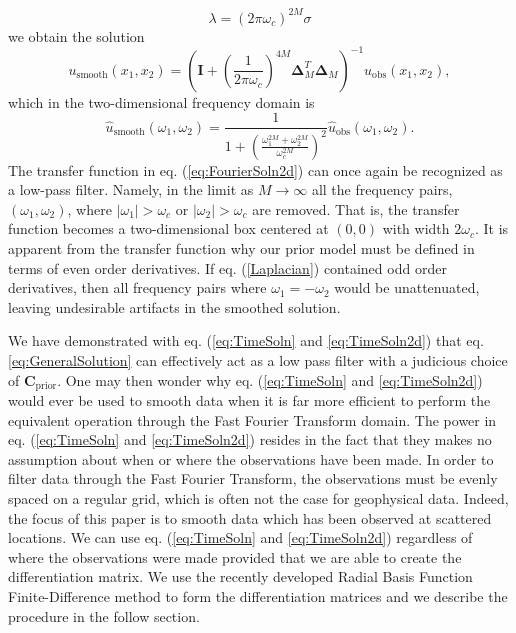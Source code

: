 \documentclass[10pt,a4paper]{article}
\begin{document}
\begin{equation}
\lambda = (2\pi\omega_c)^{2M}\sigma
\end{equation}
we obtain the solution
\begin{equation}\label{eq:TimeSoln2d}
u_\mathrm{smooth}(x_1,x_2) = \left(\mathbf{I} + 
                          \left(\frac{1}{2\pi\omega_c}\right)^{4M}
                          \mathbf{\Delta}_M^T\mathbf{\Delta}_M\right)^{-1}
                          u_\mathrm{obs}(x_1,x_2),
\end{equation}
which in the two-dimensional frequency domain is
\begin{equation}\label{eq:FourierSoln2d}
\hat{u}_\mathrm{smooth}(\omega_1,\omega_2) = \frac{1}{1 + \left(\frac{\omega_1^{2M} + \omega_2^{2M}}
                                                  {\omega_c^{2M}}\right)^2}
                                             \hat{u}_\mathrm{obs}(\omega_1,\omega_2).
\end{equation}
The transfer function in eq. (\ref{eq:FourierSoln2d}) can once again be recognized as a low-pass filter.  Namely, in the limit as $M \to \infty$ all the frequency pairs, $(\omega_1,\omega_2)$, where $|\omega_1| > \omega_c$ or $|\omega_2| > \omega_c$ are removed.  That is, the transfer function becomes a two-dimensional box centered at $(0,0)$ with width $2\omega_c$.  It is apparent from the transfer function why our prior model must be defined in terms of even order derivatives.  If eq. (\ref{Laplacian}) contained odd order derivatives, then all frequency pairs where $\omega_1=-\omega_2$ would be unattenuated, leaving undesirable artifacts in the smoothed solution.

We have demonstrated with eq. (\ref{eq:TimeSoln} and \ref{eq:TimeSoln2d}) that eq. \ref{eq:GeneralSolution} can effectively act as a low pass filter with a judicious choice of $\mathbf{C}_\mathrm{prior}$.  One may then wonder why eq. (\ref{eq:TimeSoln} and \ref{eq:TimeSoln2d}) would ever be used to smooth data when it is far more efficient to perform the equivalent operation through the Fast Fourier Transform domain.  The power in eq. (\ref{eq:TimeSoln} and \ref{eq:TimeSoln2d}) resides in the fact that they makes no assumption about when or where the observations have been made.  In order to filter data through the Fast Fourier Transform, the observations must be evenly spaced on a regular grid, which is often not the case for geophysical data.  Indeed,  the focus of this paper is to smooth data which has been observed at scattered locations.  We can use eq. (\ref{eq:TimeSoln} and \ref{eq:TimeSoln2d}) regardless of where the observations were made provided that we are able to create the differentiation matrix.  We use the recently developed Radial Basis Function Finite-Difference method to form the differentiation matrices and we describe the procedure in the follow section.  

 
\end{document}
